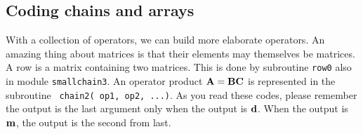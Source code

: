 %
%
%


\subsection{Coding chains and arrays}

With a collection of operators,
we can build more elaborate operators.
An amazing thing about matrices is that their elements
may themselves be matrices.
A row is a matrix containing two matrices.
This is done by subroutine \texttt{row0}
also in module \texttt{smallchain3}.
An operator product
$\bold A = \bold B \bold C$
is represented in the subroutine 
\texttt{ chain2( op1, op2, ...)}.
As you read these codes, please remember the
output is the last argument only when the output is $\bold d$.
When the output is $\bold m$, the output is the second from last.




